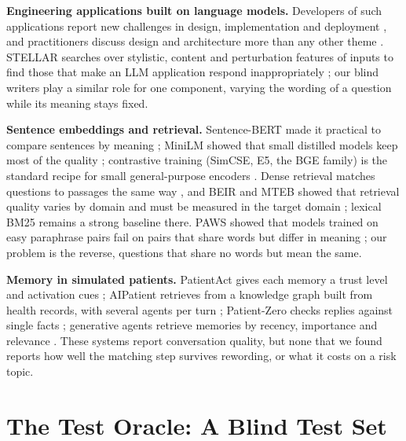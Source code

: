 \documentclass[sn-mathphys-num]{sn-jnl}
\begin{document}
\textbf{Engineering applications built on language models.} Developers of such applications report new challenges in design,
implementation and deployment \cite{chen2025llmappchallenges}, and practitioners discuss design and architecture more than any other theme
\cite{mailach2025themes}. STELLAR searches over stylistic, content and perturbation features of inputs to find those that make an LLM
application respond inappropriately \cite{sorokin2026stellar}; our blind writers play a similar role for one component, varying the wording
of a question while its meaning stays fixed.

\textbf{Sentence embeddings and retrieval.} Sentence-BERT made it practical to compare sentences by meaning \cite{reimers2019sentencebert};
MiniLM showed that small distilled models keep most of the quality \cite{wang2020minilm}; contrastive training (SimCSE, E5, the BGE family) is the
standard recipe for small general-purpose encoders \cite{gao2021simcse,wang2022e5,xiao2023cpack}. Dense retrieval matches questions to
passages the same way \cite{karpukhin2020dpr}, and BEIR and MTEB showed that retrieval quality varies by domain and must be measured in the
target domain \cite{thakur2021beir,muennighoff2022mteb}; lexical BM25 \cite{robertson2009bm25} remains a strong baseline there. PAWS showed that
models trained on easy paraphrase pairs fail on pairs that share words but differ in meaning \cite{zhang2019paws}; our problem is the reverse,
questions that share no words but mean the same.

\textbf{Memory in simulated patients.} PatientAct gives each memory a trust level and activation cues \cite{sabour2026patientact}; AIPatient
retrieves from a knowledge graph built from health records, with several agents per turn \cite{yu2024simulated}; Patient-Zero checks replies against
single facts \cite{lai2025patientzero}; generative agents retrieve memories by recency, importance and relevance \cite{park2023generative}. These
systems report conversation quality, but none that we found reports how well the matching step survives rewording, or what it costs on a risk
topic.

\section{The Test Oracle: A Blind Test Set}\label{sec:bench}
\end{document}
